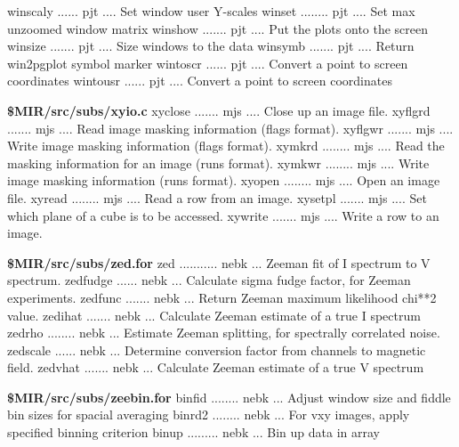 {\eightpoint\begintt
winscaly ...... pjt .... Set window user Y-scales
winset ........ pjt .... Set max unzoomed window matrix
winshow ....... pjt .... Put the plots onto the screen
winsize ....... pjt .... Size windows to the data
winsymb ....... pjt .... Return win2pgplot symbol marker
\endtt}
{\eightpoint\begintt
wintoscr ...... pjt .... Convert a point to screen coordinates
wintousr ...... pjt .... Convert a point to screen coordinates
\endtt}
\par{\bf \$MIR/src/subs/xyio.c}
{\eightpoint\begintt
xyclose ....... mjs .... Close up an image file.
xyflgrd ....... mjs .... Read image masking information (flags format).
xyflgwr ....... mjs .... Write image masking information (flags format).
xymkrd ........ mjs .... Read the masking information for an image (runs format).
xymkwr ........ mjs .... Write image masking information (runs format).
\endtt}
{\eightpoint\begintt
xyopen ........ mjs .... Open an image file.
xyread ........ mjs .... Read a row from an image.
xysetpl ....... mjs .... Set which plane of a cube is to be accessed.
xywrite ....... mjs .... Write a row to an image.
\endtt}
\par{\bf \$MIR/src/subs/zed.for}
{\eightpoint\begintt
zed ........... nebk ... Zeeman fit of I spectrum to V spectrum.
zedfudge ...... nebk ... Calculate sigma fudge factor, for Zeeman experiments.
zedfunc ....... nebk ... Return Zeeman maximum likelihood chi**2 value.
zedihat ....... nebk ... Calculate Zeeman estimate of a true I spectrum
zedrho ........ nebk ... Estimate Zeeman splitting, for spectrally correlated noise.
\endtt}
{\eightpoint\begintt
zedscale ...... nebk ... Determine conversion factor from channels to magnetic field.
zedvhat ....... nebk ... Calculate Zeeman estimate of a true V spectrum
\endtt}
\par{\bf \$MIR/src/subs/zeebin.for}
{\eightpoint\begintt
binfid ........ nebk ... Adjust window size and fiddle bin sizes for spacial averaging
binrd2 ........ nebk ... For vxy images, apply specified binning criterion
binup ......... nebk ... Bin up data in array
\endtt}
